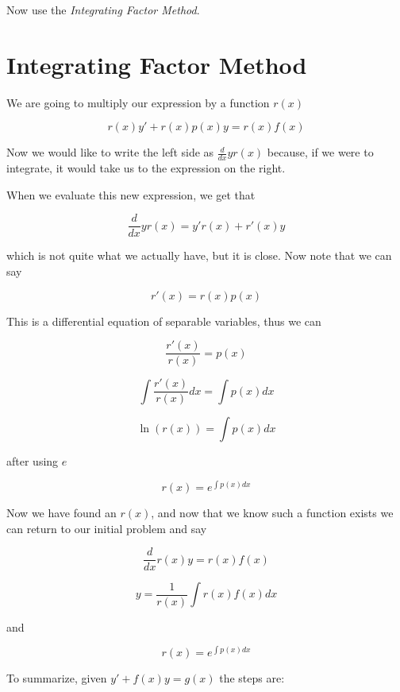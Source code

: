 Now use the \emph{Integrating Factor Method}.

\section{Integrating Factor Method}

We are going to multiply our expression by a function \(r(x)\)

\[
    r(x)y' + r(x)p(x)y = r(x)f(x)
\]

Now we would like to write the left side as \(\frac{d}{dx} y r(x)\) because, if we
were to integrate, it would take us to the expression on the right.

When we evaluate this new expression, we get that

\[
    \frac{d}{dx} y r(x) = y'r(x) + r'(x)y
\]

which is not quite what we actually have, but it is close. Now note that we can say

\[
    r'(x) = r(x)p(x)
\]

This is a differential equation of separable variables, thus we can

\[
    \frac{r'(x)}{r(x)} = p(x)
\]

\[
    \int \frac{r'(x)}{r(x)}dx = \int p(x)dx
\]

\[
    \ln(r(x)) = \int p(x) dx
\]

after using \(e\)

\[
    r(x) = e^{\int p(x) dx}
\]

Now we have found an \(r(x)\), and now that we know such a function exists we can return
to our initial problem and say

\[
    \frac{d}{dx}r(x)y = r(x)f(x)
\]

\[
    y = \frac{1}{r (x) } \int r (x) f (x) dx
\]

and

\[
    r(x) = e^{\int p (x) dx}
\]

To summarize, given \(y' + f(x)y = g(x)\) the steps are:

